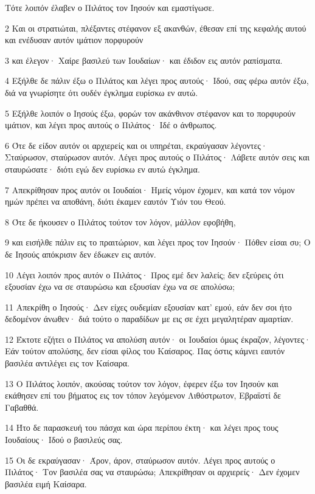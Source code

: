 \par Τότε λοιπόν έλαβεν ο Πιλάτος τον Ιησούν και εμαστίγωσε.
\par 2 Και οι στρατιώται, πλέξαντες στέφανον εξ ακανθών, έθεσαν επί της κεφαλής αυτού και ενέδυσαν αυτόν ιμάτιον πορφυρούν
\par 3 και έλεγον· Χαίρε βασιλεύ των Ιουδαίων· και έδιδον εις αυτόν ραπίσματα.
\par 4 Εξήλθε δε πάλιν έξω ο Πιλάτος και λέγει προς αυτούς· Ιδού, σας φέρω αυτόν έξω, διά να γνωρίσητε ότι ουδέν έγκλημα ευρίσκω εν αυτώ.
\par 5 Εξήλθε λοιπόν ο Ιησούς έξω, φορών τον ακάνθινον στέφανον και το πορφυρούν ιμάτιον, και λέγει προς αυτούς ο Πιλάτος· Ιδέ ο άνθρωπος.
\par 6 Ότε δε είδον αυτόν οι αρχιερείς και οι υπηρέται, εκραύγασαν λέγοντες· Σταύρωσον, σταύρωσον αυτόν. Λέγει προς αυτούς ο Πιλάτος· Λάβετε αυτόν σεις και σταυρώσατε· διότι εγώ δεν ευρίσκω εν αυτώ έγκλημα.
\par 7 Απεκρίθησαν προς αυτόν οι Ιουδαίοι· Ημείς νόμον έχομεν, και κατά τον νόμον ημών πρέπει να αποθάνη, διότι έκαμεν εαυτόν Υιόν του Θεού.
\par 8 Ότε δε ήκουσεν ο Πιλάτος τούτον τον λόγον, μάλλον εφοβήθη,
\par 9 και εισήλθε πάλιν εις το πραιτώριον, και λέγει προς τον Ιησούν· Πόθεν είσαι συ; Ο δε Ιησούς απόκρισιν δεν έδωκεν εις αυτόν.
\par 10 Λέγει λοιπόν προς αυτόν ο Πιλάτος· Προς εμέ δεν λαλείς; δεν εξεύρεις ότι εξουσίαν έχω να σε σταυρώσω και εξουσίαν έχω να σε απολύσω;
\par 11 Απεκρίθη ο Ιησούς· Δεν είχες ουδεμίαν εξουσίαν κατ' εμού, εάν δεν σοι ήτο δεδομένον άνωθεν· διά τούτο ο παραδίδων με εις σε έχει μεγαλητέραν αμαρτίαν.
\par 12 Έκτοτε εζήτει ο Πιλάτος να απολύση αυτόν· οι Ιουδαίοι όμως έκραζον, λέγοντες· Εάν τούτον απολύσης, δεν είσαι φίλος του Καίσαρος. Πας όστις κάμνει εαυτόν βασιλέα αντιλέγει εις τον Καίσαρα.
\par 13 Ο Πιλάτος λοιπόν, ακούσας τούτον τον λόγον, έφερεν έξω τον Ιησούν και εκάθησεν επί του βήματος εις τον τόπον λεγόμενον Λιθόστρωτον, Εβραϊστί δε Γαβαθθά.
\par 14 Ήτο δε παρασκευή του πάσχα και ώρα περίπου έκτη· και λέγει προς τους Ιουδαίους· Ιδού ο βασιλεύς σας.
\par 15 Οι δε εκραύγασαν· Άρον, άρον, σταύρωσον αυτόν. Λέγει προς αυτούς ο Πιλάτος· Τον βασιλέα σας να σταυρώσω; Απεκρίθησαν οι αρχιερείς· Δεν έχομεν βασιλέα ειμή Καίσαρα.

